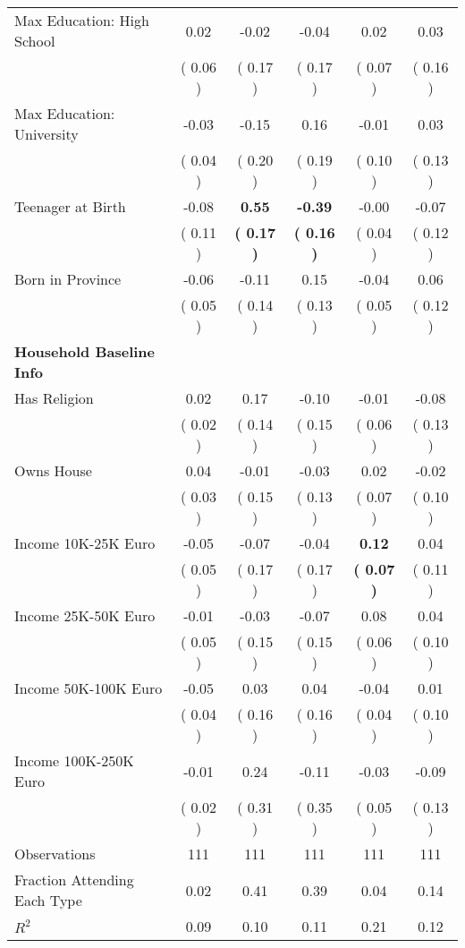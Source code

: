 \begin{table}[H]
{\begin{tabular}{lccccc}
\quad Max Education: High School &      0.02 &     -0.02 &     -0.04 &      0.02 &      0.03 \\
\quad  & (     0.06 ) & (     0.17 )  & (     0.17 )  & (     0.07 ) & (     0.16 ) \\
\quad Max Education: University &     -0.03 &     -0.15 &      0.16 &     -0.01 &      0.03 \\
\quad  & (     0.04 ) & (     0.20 )  & (     0.19 )  & (     0.10 ) & (     0.13 ) \\
\quad Teenager at Birth &     -0.08 & \textbf{     0.55} & \textbf{    -0.39} &     -0.00 &     -0.07 \\
\quad  & (     0.11 ) & \textbf{(     0.17 )}  & \textbf{(     0.16 )}  & (     0.04 ) & (     0.12 ) \\
\quad Born in Province &     -0.06 &     -0.11 &      0.15 &     -0.04 &      0.06 \\
\quad  & (     0.05 ) & (     0.14 )  & (     0.13 )  & (     0.05 ) & (     0.12 ) \\
\midrule
\textbf{Household Baseline Info} \\
\quad Has Religion &      0.02 &      0.17 &     -0.10 &     -0.01 &     -0.08 \\
\quad  & (     0.02 ) & (     0.14 )  & (     0.15 )  & (     0.06 ) & (     0.13 ) \\
\quad Owns House &      0.04 &     -0.01 &     -0.03 &      0.02 &     -0.02 \\
\quad  & (     0.03 ) & (     0.15 )  & (     0.13 )  & (     0.07 ) & (     0.10 ) \\
\quad Income 10K-25K Euro &     -0.05 &     -0.07 &     -0.04 & \textbf{     0.12} &      0.04 \\
\quad  & (     0.05 ) & (     0.17 )  & (     0.17 )  & \textbf{(     0.07 )} & (     0.11 ) \\
\quad Income 25K-50K Euro &     -0.01 &     -0.03 &     -0.07 &      0.08 &      0.04 \\
\quad  & (     0.05 ) & (     0.15 )  & (     0.15 )  & (     0.06 ) & (     0.10 ) \\
\quad Income 50K-100K Euro &     -0.05 &      0.03 &      0.04 &     -0.04 &      0.01 \\
\quad  & (     0.04 ) & (     0.16 )  & (     0.16 )  & (     0.04 ) & (     0.10 ) \\
\quad Income 100K-250K Euro &     -0.01 &      0.24 &     -0.11 &     -0.03 &     -0.09 \\
\quad  & (     0.02 ) & (     0.31 )  & (     0.35 )  & (     0.05 ) & (     0.13 ) \\
\midrule
Observations & 111 & 111 & 111 & 111 & 111 \\
Fraction Attending Each Type &      0.02 &      0.41 &      0.39 &      0.04 &      0.14 \\
\midrule
$ R^2$ &      0.09 &      0.10 &      0.11 &      0.21 &      0.12 \\
\bottomrule
\end{tabular}}
\end{table}

